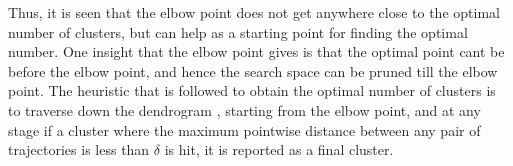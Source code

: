%
%    
Thus, it is seen that the elbow point does not get anywhere close to the optimal number of clusters, but can help as a starting point for finding the optimal number. One insight that the elbow point gives is that the optimal point cant be before the elbow point, and hence the search space can be pruned till the elbow point. 
The heuristic that is followed to obtain the optimal number of clusters is to traverse down the dendrogram , starting from the elbow point, and at any stage if a cluster where the maximum pointwise distance between any pair of trajectories is less than $\delta$ is hit, it is reported as a final cluster. 



